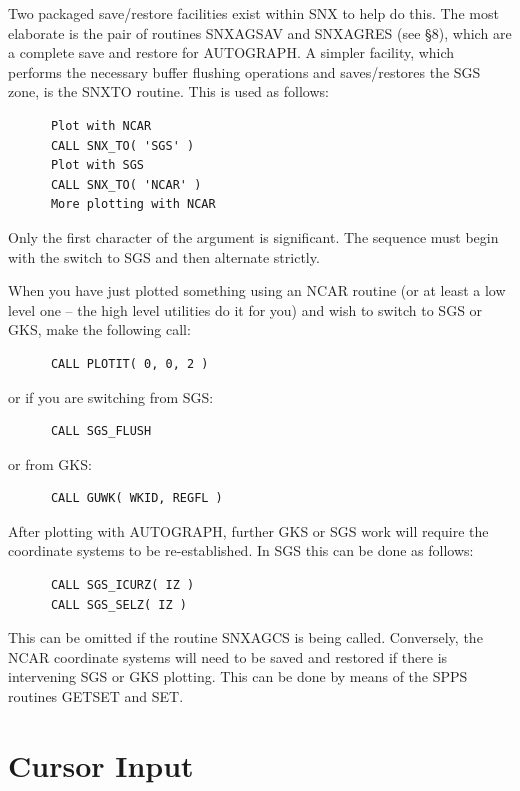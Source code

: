 \documentclass[twoside,11pt]{article}
\renewcommand{\_}{\texttt{\symbol{95}}}
\begin{document}
Two packaged save/restore facilities exist within SNX to help
do this.
The most elaborate is the pair of routines SNX\_AGSAV and SNX\_AGRES
(see \S 8), which are a complete save and restore for AUTOGRAPH.
A simpler facility, which performs the
necessary buffer flushing operations and saves/restores the
SGS zone, is the SNX\_TO routine.
This is used as follows:

\begin{verbatim}
      Plot with NCAR
      CALL SNX_TO( 'SGS' )
      Plot with SGS
      CALL SNX_TO( 'NCAR' )
      More plotting with NCAR
\end{verbatim}

Only the first character of the argument is significant.
The sequence must begin with the switch to SGS and then alternate strictly.

When you have just plotted something using an NCAR
routine (or at least a low level one -- the high level utilities do it
for you) and wish to switch to SGS or GKS, make the following call:

\begin{verbatim}
      CALL PLOTIT( 0, 0, 2 )
\end{verbatim}

or if you are switching from SGS:

\begin{verbatim}
      CALL SGS_FLUSH
\end{verbatim}

or from GKS:

\begin{verbatim}
      CALL GUWK( WKID, REGFL )
\end{verbatim}

After plotting with AUTOGRAPH, further GKS or SGS work will
require the coordinate systems to be re-established.
In SGS this can be done as follows:

\begin{verbatim}
      CALL SGS_ICURZ( IZ )
      CALL SGS_SELZ( IZ )
\end{verbatim}

This can be omitted if the routine SNX\_AGCS is being called.
Conversely, the NCAR coordinate systems will need to be saved and
restored if there is intervening SGS or GKS plotting.
This can be done by means of the SPPS routines
GETSET and SET.


\section {Cursor Input}
\end{document}

